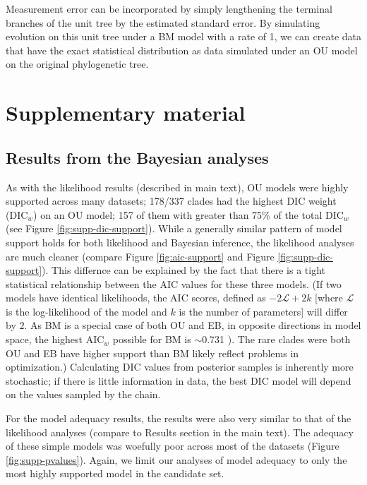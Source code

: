 \documentclass[a4paper,12pt]{article}
\begin{document}
Measurement error can be incorporated by simply lengthening the terminal branches of the unit tree by the estimated standard error. By simulating evolution on this unit tree under a BM model with a rate of 1, we can create data that have the exact statistical distribution as data simulated under an OU model on the original phylogenetic tree.


\newpage
\section{Supplementary material}
\subsection{Results from the Bayesian analyses}
As with the likelihood results (described in main text), OU models were highly supported across many datasets; 
178/337 clades had the highest DIC weight (DIC$_w$) on an OU model; 157 of them with greater than 75\% of the total DIC$_w$ (see Figure \ref{fig:supp-dic-support}). While a generally similar pattern of model support holds for both likelihood and Bayesian inference, the likelihood analyses are much cleaner (compare Figure \ref{fig:aic-support} and Figure \ref{fig:supp-dic-support}). This differnce can be explained by the fact that there is a tight statistical relationship between the AIC values for these three models. (If two models have identical likelihoods, the AIC scores, defined as $-2\mathcal{L} + 2k$ [where $\mathcal{L}$ is the log-likelihood of the model and $k$ is the number of parameters] will differ by $2$. As BM is a special case of both OU and EB, in opposite directions in model space, the highest AIC$_w$ possible for BM is $\sim$0.731 \citep{SlaterPennell}). The rare clades were both OU and EB have higher support than BM likely reflect problems in optimization.) Calculating DIC values from posterior samples is inherently more stochastic; if there is little information in data, the best DIC model will depend on the values sampled by the chain. 

For the model adequacy results, the results were also very similar to that of the likelihood analyses (compare to Results section in the main text). The adequacy of these simple models was woefully poor across most of the datasets (Figure \ref{fig:supp-pvalues}). Again, we limit our analyses of model adequacy to only the most highly supported model in the candidate set.
\end{document}
